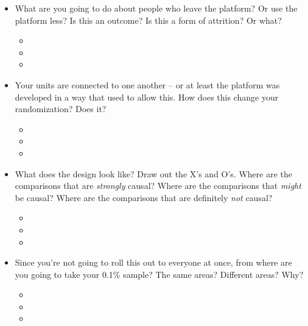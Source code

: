 \documentclass{article}
\begin{document}
\begin{itemize}
\begin{itemize}
\item 

\item 
\end{itemize}
\item What are you going to do about people who leave the platform? Or use the platform less? Is this an outcome? Is this a form of attrition? Or what?
\begin{itemize}
\item 

\item 

\item 
\end{itemize}
\item Your units are connected to one another -- or at least the platform was developed in a way that used to allow this. How does this change your randomization? Does it?
\begin{itemize}
\item 

\item 

\item 
\end{itemize}
\item What does the design look like? Draw out the X's and O's. Where are the comparisons that are \emph{strongly} causal? Where are the comparisons that \emph{might} be causal? Where are the comparisons that are definitely \emph{not} causal?
\begin{itemize}
\item 

\item 

\item 
\end{itemize}
\item Since you're not going to roll this out to everyone at once, from where are you going to take your 0.1\% sample? The same areas? Different areas? Why?
\begin{itemize}
\item 

\item 

\item 
\end{itemize}
\end{itemize}
\end{document}

